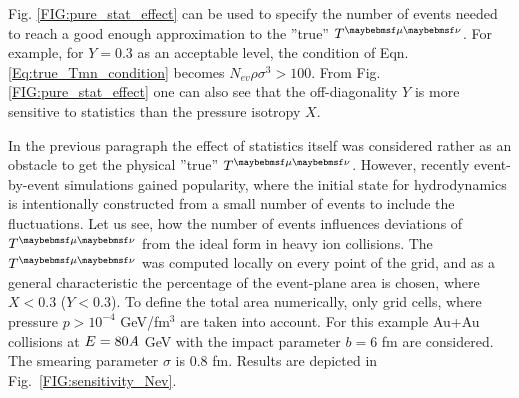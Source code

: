 Fig. \ref{FIG:pure_stat_effect} can be used to specify the number of events
needed to reach a good enough approximation to the ''true'' $\Tmn$. For example,
for $Y=0.3$ as an acceptable level, the condition of Eqn.
\ref{Eq:true_Tmn_condition} becomes $N_{ev} \rho \sigma^3 > 100$. From Fig.
\ref{FIG:pure_stat_effect} one can also see that the off-diagonality $Y$ is more
sensitive to statistics than the pressure isotropy $X$.

In the previous paragraph the effect of statistics itself was considered rather
as an obstacle to get the physical ''true'' $\Tmn$. However, recently
event-by-event simulations gained popularity, where the initial state for
hydrodynamics is intentionally constructed from a small number of events to
include the fluctuations. Let us see, how the number of events influences
deviations of $\Tmn$ from the ideal form in heavy ion collisions. The $\Tmn$ was
computed locally on every point of the grid, and as a general characteristic
the percentage of the event-plane area is chosen, where $X < 0.3$ ($Y < 0.3$). To
define the total area numerically, only grid cells, where pressure $p > 10^{-4}$
GeV/fm$^3$ are taken into account. For this example Au+Au collisions at $E =
80\emph{A}$ GeV with the impact parameter $b = 6$ fm are considered. The
smearing parameter $\sigma$ is 0.8 fm. Results are depicted in
Fig.~\ref{FIG:sensitivity_Nev}.

